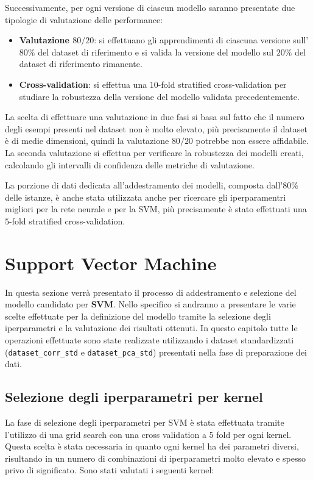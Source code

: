 Successivamente, per ogni versione di ciascun modello saranno presentate due
tipologie di valutazione delle performance:
\begin{itemize}
    \item \textbf{Valutazione $80/20$}: si effettuano gli apprendimenti di
          ciascuna versione sull'$80\%$ del dataset di riferimento e si valida
          la versione del modello sul $20\%$ del dataset di riferimento rimanente.
    \item \textbf{Cross-validation}: si effettua una $10$-fold stratified
          cross-validation per studiare la robustezza della versione del modello
          validata precedentemente.
\end{itemize}
La scelta di effettuare una valutazione in due fasi si basa sul fatto che il
numero degli esempi presenti nel dataset non è molto elevato, più precisamente
il dataset è di medie dimensioni, quindi la valutazione $80/20$ potrebbe non
essere affidabile. La seconda valutazione si effettua per verificare la
robustezza dei modelli creati, calcolando gli intervalli di confidenza delle
metriche di valutazione.

La porzione di dati dedicata all'addestramento dei modelli, composta dall'$80\%$
delle istanze, è anche stata utilizzata anche per ricercare gli iperparamentri 
migliori per la rete neurale e per la SVM, più precisamente è stato effettuati 
una $5$-fold stratified cross-validation.

\section{Support Vector Machine}
In questa sezione verrà presentato il processo di addestramento e selezione del modello
candidato per \textbf{SVM}. Nello specifico si andranno a presentare le varie scelte
effettuate per la definizione del modello tramite la selezione degli iperparametri e 
la valutazione dei risultati ottenuti.
In questo capitolo tutte le operazioni effettuate sono state realizzate 
utilizzando i dataset standardizzati (\texttt{dataset\_corr\_std} e 
\texttt{dataset\_pca\_std}) presentati nella fase di preparazione dei 
dati.

\subsection{Selezione degli iperparametri per kernel}
La fase di selezione degli iperparametri per SVM è stata effettuata tramite 
l'utilizzo di una grid search con una cross validation a 5 fold per ogni kernel.
Questa scelta è stata necessaria in quanto ogni kernel ha dei parametri diversi,
risultando in un numero di combinazioni di iperparametri molto elevato e spesso 
privo di significato.
Sono stati valutati i seguenti kernel:

